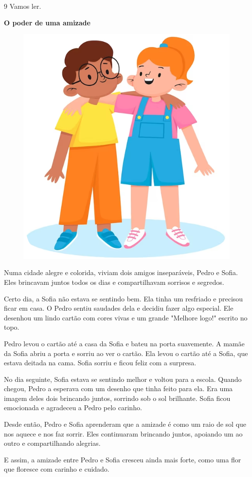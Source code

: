 \pagebreak
\num{9} Vamos ler.
\enlargethispage{2\baselineskip}

\begin{myquote}
\textbf{O poder de uma amizade}

\begin{figure}[H]
\centering
\includegraphics[width=.6\textwidth]{media/image199.png}
\end{figure}

Numa cidade alegre e colorida, viviam dois amigos inseparáveis, Pedro e Sofia. Eles brincavam juntos todos os dias e compartilhavam sorrisos e segredos.

Certo dia, a Sofia não estava se sentindo bem. Ela tinha um resfriado e precisou ficar em casa. O Pedro sentiu saudades dela e decidiu fazer algo especial. Ele desenhou um lindo cartão com cores vivas e um grande "Melhore logo!" escrito no topo.

Pedro levou o cartão até a casa da Sofia e bateu na porta suavemente. A mamãe da Sofia abriu a porta e sorriu ao ver o cartão. Ela levou o cartão até a Sofia, que estava deitada na cama. Sofia sorriu e ficou feliz com a surpresa.

No dia seguinte, Sofia estava se sentindo melhor e voltou para a escola. Quando chegou, Pedro a esperava com um desenho que tinha feito para ela. Era uma imagem deles dois brincando juntos, sorrindo sob o sol brilhante. Sofia ficou emocionada e agradeceu a Pedro pelo carinho.

Desde então, Pedro e Sofia aprenderam que a amizade é como um raio de sol que nos aquece e nos faz sorrir. Eles continuaram brincando juntos, apoiando um ao outro e compartilhando alegrias.

E assim, a amizade entre Pedro e Sofia cresceu ainda mais forte, como uma flor que floresce com carinho e cuidado.
\end{myquote}

